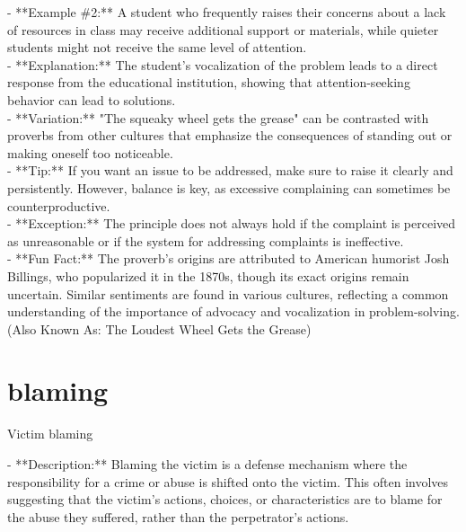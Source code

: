 \documentclass[a4paper,12pt,single,pdftex]{scrbook}
\begin{document}
    
      - **Example \#2:** A student who frequently raises their concerns about a lack of resources in class may receive additional support or materials, while quieter students might not receive the same level of attention.
    \\

    
      - **Explanation:** The student's vocalization of the problem leads to a direct response from the educational institution, showing that attention-seeking behavior can lead to solutions.
    \\

    
      - **Variation:** "The squeaky wheel gets the grease" can be contrasted with proverbs from other cultures that emphasize the consequences of standing out or making oneself too noticeable.
    \\

    
      - **Tip:** If you want an issue to be addressed, make sure to raise it clearly and persistently. However, balance is key, as excessive complaining can sometimes be counterproductive.
    \\

    
      - **Exception:** The principle does not always hold if the complaint is perceived as unreasonable or if the system for addressing complaints is ineffective.
    \\

    
      - **Fun Fact:** The proverb's origins are attributed to American humorist Josh Billings, who popularized it in the 1870s, though its exact origins remain uncertain. Similar sentiments are found in various cultures, reflecting a common understanding of the importance of advocacy and vocalization in problem-solving.
    \\

  
    
      (Also Known As: The Loudest Wheel Gets the Grease)
    \\

  \section{blaming}


Victim blaming
    
      - **Description:** Blaming the victim is a defense mechanism where the responsibility for a crime or abuse is shifted onto the victim. This often involves suggesting that the victim’s actions, choices, or characteristics are to blame for the abuse they suffered, rather than the perpetrator’s actions.
    \\
\end{document}

